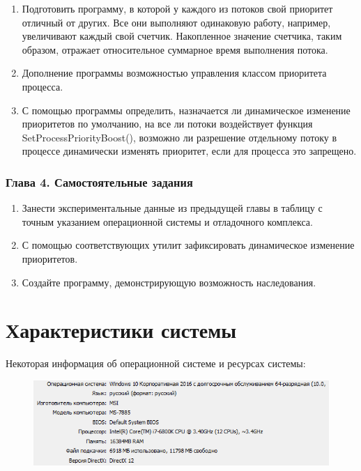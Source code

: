 \documentclass[14pt,a4paper,report]{report}
\begin{document}
\begin{enumerate}
	\item Подготовить программу, в которой у каждого из потоков свой приоритет отличный от других. Все они выполняют одинаковую работу, например, увеличивают каждый свой счетчик. Накопленное значение счетчика, таким образом, отражает относительное суммарное время выполнения потока.
	\item Дополнение программы возможностью управления классом приоритета процесса.
	\item С помощью программы определить, назначается ли динамическое изменение приоритетов по умолчанию, на все ли потоки воздействует функция SetProcessPriorityBoost(), возможно ли разрешение отдельному потоку в процессе динамически изменять приоритет, если для процесса это запрещено.
\end{enumerate}

\subsubsection{Глава 4. Самостоятельные задания}

\begin{enumerate}
	\item Занести экспериментальные данные из предыдущей главы в таблицу с точным указанием операционной системы и отладочного комплекса. 
	\item С помощью соответствующих утилит зафиксировать динамическое изменение приоритетов.
	\item Создайте программу, демонстрирующую возможность наследования. 
\end{enumerate}

\section{Характеристики системы}

Некоторая информация об операционной системе и ресурсах системы:

\begin{figure}[h!]
	\centering
	\includegraphics[scale = 1.05]{images/0.png}
	
	\caption{}
	\label{image:1}
\end{figure}
\end{document}
